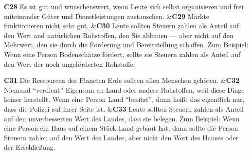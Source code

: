 \documentclass[
		11pt,
		a4paper,
		openright,
		oneside,
		ngerman
	]
	{book}
\begin{document}
\begin{longtabu}[htpb]
\textbf{C28} %
		Es ist gut und wünschenswert, wenn Leute sich selbst organisieren und frei miteinander Güter und Dienstleistungen austauschen.
&\textbf{C29} %
		Märkte funktionieren nicht sehr gut.
&\textbf{C30} %
		Leute sollten Steuern zahlen als Anteil auf den Wert and natürlichen Rohstoffen, den Sie abbauen --- aber nicht auf den Mehrwert, den sie durch die Förderung und Bereitstellung schaffen.
		Zum Beispiel: Wenn eine Person Bodenschätze fördert, sollte sie Steuern zahlen als Anteil auf den Wert der noch ungeförderten Rohstoffe.
\\

\midrule

\textbf{C31}
		Die Ressourcen des Planeten Erde sollten allen Menschen gehören.
&\textbf{C32}
		Niemand ``verdient'' Eigentum an Land oder andere Rohstoffen, weil diese Dinge keiner herstellt.
		Wenn eine Person Land ``besitzt'', dann heißt das eigentlich nur, dass die Polizei auf ihrer Seite ist.
&\textbf{C33} %
		Leute sollten Steuern zahlen als Anteil auf den unverbesserten Wert des Landes, dass sie belegen.
		Zum Beispiel: Wenn eine Person ein Haus auf einem Stück Land gebaut hat, dann sollte die Person Steuern zahlen auf den Wert des Landes, aber nicht den Wert des Hauses oder der Erschließung.
\\

\midrule


\end{longtabu}
\end{document}
